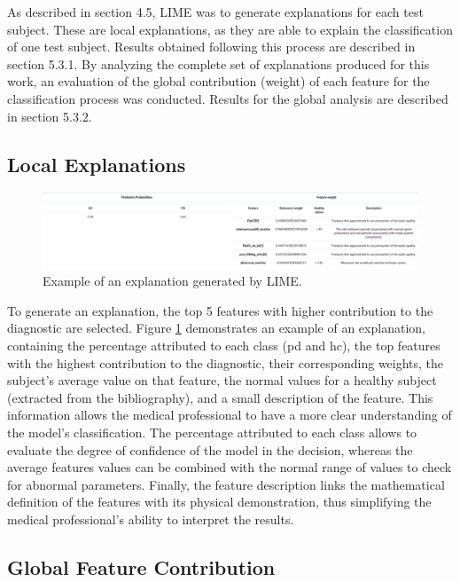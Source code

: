 As described in section 4.5, LIME was to generate explanations for each test subject. These are local explanations, as they are able to explain the classification of one test subject. Results obtained following this process are described in section 5.3.1. By analyzing the complete set of explanations produced for this work, an evaluation of the global contribution (weight) of each feature for the classification process was conducted. Results for the global analysis are described in section 5.3.2.

\subsection{Local Explanations}

\begin{figure}[t]
	\begin{center}
		\includegraphics[clip=true, width=\textwidth]{figs/example_explanation.png}
	\end{center}
	\caption{Example of an explanation generated by LIME.}
	\label{explanation}
\end{figure}

To generate an explanation, the top 5 features with higher contribution to the diagnostic are selected. Figure \ref{explanation} demonstrates an example of an explanation, containing the percentage attributed to each class (\gls{pd} and \gls{hc}), the top features with the highest contribution to the diagnostic, their corresponding weights, the subject's average value on that feature, the normal values for a healthy subject (extracted from the bibliography), and a small description of the feature. This information allows the medical professional to have a more clear understanding of the model's classification. The percentage attributed to each class allows to evaluate the degree of confidence of the model in the decision, whereas the average features values can be combined with the normal range of values to check for abnormal parameters. Finally, the feature description links the mathematical definition of the features with its physical demonstration, thus simplifying the medical professional's ability to interpret the results. 

\subsection{Global Feature Contribution}

